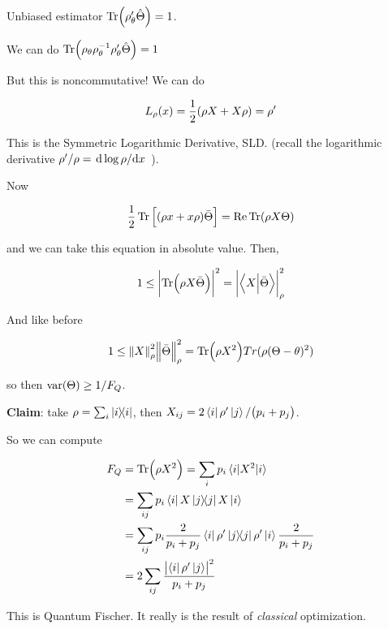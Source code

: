 Unbiased estimator \( \Tr (\rho_\theta ' \hat{\Theta}) = 1 \).

We can do \( \Tr (\rho_\theta \rho_\theta ^{-1} \rho_\theta ' \hat{\Theta}) = 1 \)

But this is noncommutative! We can do

\begin{equation} \label{eq:SLD-def}
  L_\rho (x)  = \frac{1}{2} \qty(\rho X + X \rho) = \rho'
\end{equation}

This is the Symmetric Logarithmic Derivative, SLD.
(recall the logarithmic derivative \( \rho' / \rho = \dv*{\log \rho}{x} \) ).

Now

\begin{equation}
  \frac{1}{2} \Tr \qty[\qty(\rho x + x \rho) \bar{\Theta}] = \Re \Tr (\rho X \Theta)
\end{equation}

and we can take this equation in absolute value. Then,

\begin{equation}
  1 \leq \abs{\Tr (\rho X \bar{\Theta})}^{2} = \abs{\braket{X}{\bar{\Theta}}}^{2}_{\rho}
\end{equation}

And like before

\begin{equation}
  1 \leq \norm{X}^{2} _{\rho}  \norm{\bar{\Theta}}^{2} _{\rho}
  = \Tr (\rho X^2 ) Tr(\rho (\Theta - \theta)^2)
\end{equation}

so then \( \text{var} \qty(\Theta) \geq 1/F_Q \).

\textbf{Claim}: take \( \rho = \sum_i \ketbra{i} \), then \( X _{ij} = 2\bra{i}\rho' \ket{j}/\qty(p_i + p_j) \).

So we can compute

\begin{align}
  F_Q &= \Tr(\rho X^2) = \sum_i p_i \ev{X^2}{i}  \\
  &= \sum _{ij} p_i \bra{i} X \ketbra{j} X \ket{i}  \\
  &= \sum _{ij} p_i \frac{2}{p_i + p_j} \bra{i} \rho' \ketbra{j} \rho' \ket{i} \frac{2}{p_i + p_j}  \\
  &= 2 \sum _{ij} \frac{\abs{\bra{i} \rho' \ket{j}}^2 }{p_i + p_j}
\end{align}

This is Quantum Fischer. It really is the result of \emph{classical} optimization.


